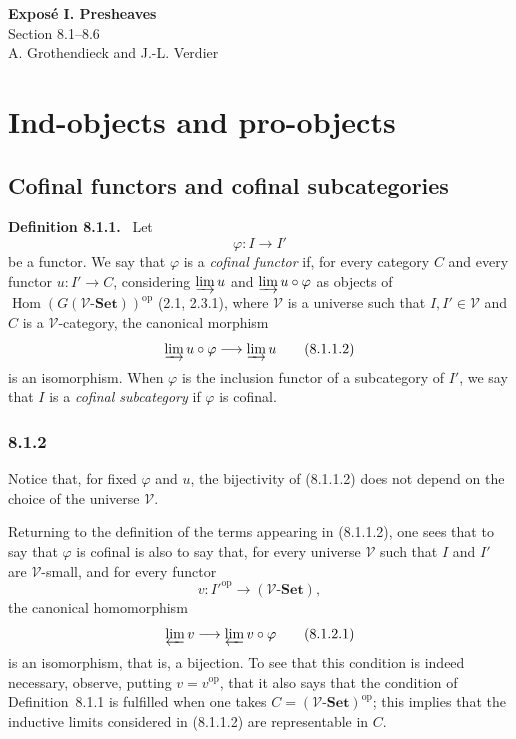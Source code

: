 \documentclass[11pt]{article}
\newcommand{\V}{\mathcal{V}}
\newcommand{\Set}{\mathbf{Set}}
\newcommand{\op}{\mathrm{op}}
\newcommand{\Hhom}{\operatorname{Hom}}
\newenvironment{statement}[1]{\par\medskip\noindent\textbf{#1.}\ }{\par\medskip}
\begin{document}
\begin{center}
{\Large \textbf{Expos\'e I. Presheaves}}\\[0.35em]
{\large Section 8.1--8.6}\\[0.35em]
A. Grothendieck and J.-L. Verdier
\end{center}

\bigskip


\setcounter{section}{7}
\section{Ind-objects and pro-objects}

\subsection{Cofinal functors and cofinal subcategories}

\begin{statement}{Definition 8.1.1}
Let
\[
\varphi:I\longrightarrow I'
\tag{8.1.1.1}
\]
be a functor. We say that $\varphi$ is a \emph{cofinal functor} if, for every category $C$ and every functor $u:I'\to C$, considering $\varinjlim u$ and $\varinjlim u\circ\varphi$ as objects of $\Hhom(G(\V\text{-}\Set))^{\op}$ (2.1, 2.3.1), where $\V$ is a universe such that $I,I'\in\V$ and $C$ is a $\V$-category, the canonical morphism
\[
\varinjlim u\circ\varphi\longrightarrow \varinjlim u
\tag{8.1.1.2}
\]
is an isomorphism. When $\varphi$ is the inclusion functor of a subcategory of $I'$, we say that $I$ is a \emph{cofinal subcategory} if $\varphi$ is cofinal.
\end{statement}

\subsubsection*{8.1.2}
Notice that, for fixed $\varphi$ and $u$, the bijectivity of (8.1.1.2) does not depend on the choice of the universe $\V$.

Returning to the definition of the terms appearing in (8.1.1.2), one sees that to say that $\varphi$ is cofinal is also to say that, for every universe $\V$ such that $I$ and $I'$ are $\V$-small, and for every functor
\[
v:{I'}^{\op}\longrightarrow (\V\text{-}\Set),
\]
the canonical homomorphism
\[
\varprojlim v\longrightarrow \varprojlim v\circ\varphi
\tag{8.1.2.1}
\]
is an isomorphism, that is, a bijection. To see that this condition is indeed necessary, observe, putting $v=v^{\op}$, that it also says that the condition of Definition~8.1.1 is fulfilled when one takes $C=(\V\text{-}\Set)^{\op}$; this implies that the inductive limits considered in (8.1.1.2) are representable in $C$.
\end{document}
